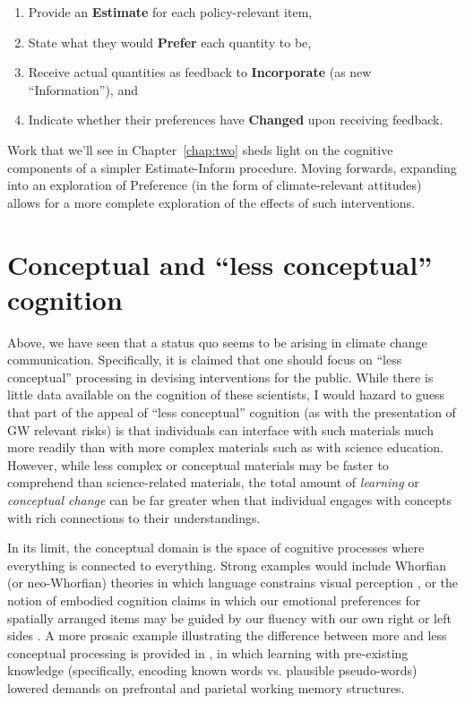 \begin{enumerate}
\item Provide an \textbf{Estimate} for each policy-relevant item,
\item State what they would \textbf{Prefer} each quantity to be, 
\item Receive actual quantities as feedback to \textbf{Incorporate} (as new
``Information''), and 
\item Indicate whether their preferences have \textbf{Changed} upon receiving feedback.
\end{enumerate}

Work that we'll see in Chapter~\ref{chap:two} sheds light on the cognitive
components of a simpler Estimate-Inform procedure. Moving forwards, expanding
into an exploration of Preference (in the form of climate-relevant attitudes)
allows for a more complete exploration of the effects of such interventions.

\section{Conceptual and \texorpdfstring{``less conceptual''}{``less conceptual''} cognition}
\label{sec:two}


Above, we have seen that a status quo seems to be arising in climate change
communication. Specifically, it is claimed that one should focus on ``less
conceptual'' processing in devising interventions for the public. While there is
little data available on the cognition of these scientists, I would hazard to
guess that part of the appeal of ``less conceptual'' cognition (as with the
presentation of GW relevant risks) is that individuals can interface with such
materials much more readily than with more complex materials such as
with science education. However, while less complex or conceptual materials
may be faster to comprehend than science-related materials, the total amount of 
\emph{learning} or \emph{conceptual change} can be far greater when that
individual engages with concepts with rich connections to their understandings.

In its limit, the conceptual domain is the space of cognitive processes where
everything is connected to everything. Strong examples would include Whorfian
(or neo-Whorfian) theories in which language constrains visual perception
\parencite{boroditsky_does_2001}, or the notion of embodied cognition claims in
which our emotional preferences for spatially arranged items may be guided by
our fluency with our own right or left sides
\parencite{casasanto_embodiment_2009}. A more prosaic example illustrating the
difference between more and less conceptual processing is provided in
\textcite{clark_assembling_2003}, in which learning with pre-existing knowledge
(specifically, encoding known words vs. plausible pseudo-words) lowered demands
on prefrontal and parietal working memory structures.

